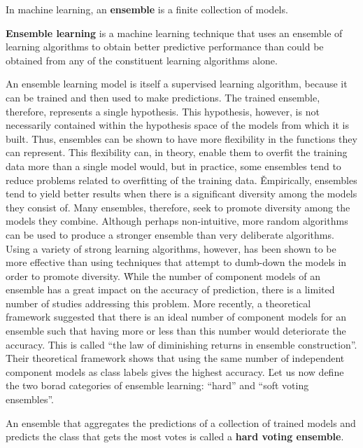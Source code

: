 \bd[Ensemble]
In machine learning, an \textbf{ensemble} is a finite collection of models.
\ed

\textbf{Ensemble learning} is a machine learning technique that uses an ensemble of learning algorithms to obtain
better predictive performance than could be obtained from any of the constituent learning algorithms alone.
\ed

An ensemble learning model is itself a supervised learning algorithm, because it can be trained and then used to
make predictions. The trained ensemble, therefore, represents a single hypothesis. This hypothesis, however, is not
necessarily contained within the hypothesis space of the models from which it is built. Thus, ensembles can be shown
to have more flexibility in the functions they can represent. This flexibility can, in theory, enable them to
overfit the training data more than a single model would, but in practice, some ensembles tend to reduce problems
related to overfitting of the training data. \v

Empirically, ensembles tend to yield better results when there is a significant diversity among the models they
consist of. Many ensembles, therefore, seek to promote diversity among the models they combine. Although perhaps
non-intuitive, more random algorithms can be used to produce a stronger ensemble than very deliberate algorithms.
Using a variety of strong learning algorithms, however, has been shown to be more effective than using techniques
that attempt to dumb-down the models in order to promote diversity. \v

While the number of component models of an ensemble has a great impact on the accuracy of prediction, there is a
limited number of studies addressing this problem. More recently, a theoretical framework suggested that there is an
ideal number of component models for an ensemble such that having more or less than this number  would deteriorate
the accuracy. This is called ``the law of diminishing returns in ensemble construction''. Their theoretical
framework shows that using the same number of independent component models as class labels gives the highest
accuracy. \v

Let us now define the two borad categories of ensemble learning: ``hard'' and ``soft voting ensembles''.

An ensemble that aggregates the predictions of a collection of trained models and predicts the class that gets the most
votes is called a \textbf{hard voting ensemble}.
\ed

